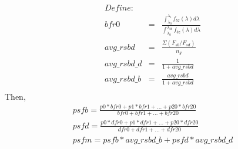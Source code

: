 \documentclass{beamer}
\begin{document}
\begin{eqnarray}
Define:\\
bfr0 &=& \frac{\int_{\lambda_{0}}^{\lambda_{1}} f_{bz} (\lambda) d\lambda}{\int_{\lambda_{0}}^{\lambda_{20}} f_{bz} (\lambda) d\lambda}\\
avg\_rsbd &=& \frac{\Sigma(F_{sb}/ F_{sd})}{n_g}\\
avg\_rsbd\_d &=& \frac{1}{1 + avg\_rsbd}\\
avg\_rsbd\_b &=& \frac{avg\_rsbd}{1 + avg\_rsbd}\\
\end{eqnarray}
Then,
\begin{eqnarray}
psfb = \frac{p0*bfr0 + p1*bfr1 + ... + p20*bfr20}{bfr0 + bfr1 + ... + bfr20}\\
psfd = \frac{p0*dfr0 + p1*dfr1 + ... + p20*dfr20}{dfr0 + dfr1 + ... + dfr20}\\
psfm = psfb * avg\_rsbd\_b + psfd * avg\_rsbd\_d
\end{eqnarray}
\end{document}
